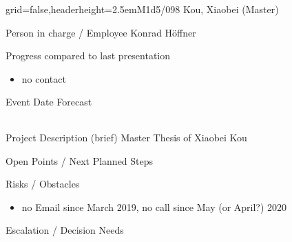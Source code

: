 \documentclass[english]{kiesgrube}
\begin{document}
\newpage

\begin{poster}{grid=false,headerheight=2.5em}{}{M1d5/098 Kou, Xiaobei (Master)}{}{}
\begin{posterbox}[name=person,column=0,row=0]{Person in charge / Employee}
Konrad Höffner
\end{posterbox}
\begin{posterbox}[name=progress,below=person]{Progress compared to last presentation}
\small
\begin{itemize}
\item no contact
\end{itemize}
\end{posterbox}
\begin{posterbox}[name=event,below=progress]{Event Date Forecast}
\begin{tabulary}{\textwidth}{lL}
\end{tabulary}
\end{posterbox}
\begin{posterbox}[name=description,column=1,row=0]{Project Description (brief)}
Master Thesis of Xiaobei Kou
\end{posterbox}
\begin{posterbox}[name=open,column=1,below=description]{Open Points / Next Planned Steps}
\end{posterbox}
\begin{posterbox}[name=risks,column=1,below=open]{Risks / Obstacles}
\begin{itemize}
\item no Email since March 2019, no call since May (or April?) 2020
\end{itemize}
\end{posterbox}
\begin{posterbox}[name=escalation,column=1,below=risks]{Escalation / Decision Needs}

\end{posterbox}
\end{poster}
\end{document}
